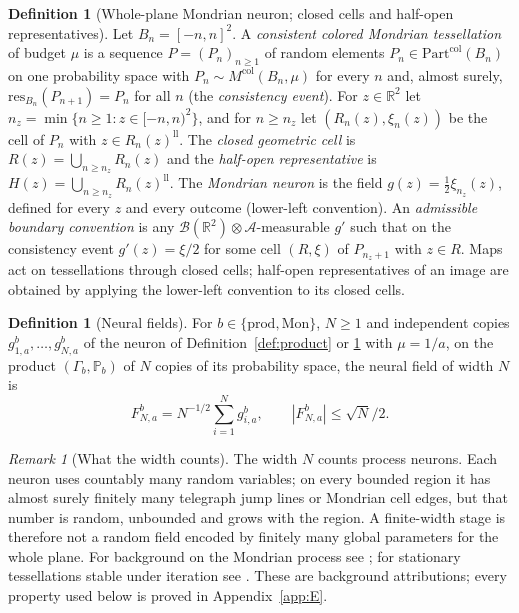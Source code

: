 \documentclass[11pt]{article}
\theoremstyle{plain}
\theoremstyle{definition}
\newtheorem{definition}[theorem]{Definition}
\theoremstyle{remark}
\newtheorem{remark}[theorem]{Remark}
\newcommand{\R}{\mathbb{R}}
\newcommand{\PP}{\mathbb{P}}
\newcommand{\cB}{\mathcal{B}}
\newcommand{\cA}{\mathcal{A}}
\newcommand{\bprod}{\mathrm{prod}}
\newcommand{\bMon}{\mathrm{Mon}}
\newcommand{\Part}{\mathrm{Part}}
\newcommand{\Mcol}{M^{\mathrm{col}}}
\newcommand{\resB}{\mathrm{res}}
\begin{document}
\begin{definition}[Whole-plane Mondrian neuron; closed cells and half-open
representatives]\label{def:mondrian}
Let $B_n=[-n,n]^{2}$. A \emph{consistent colored Mondrian tessellation} of budget
$\mu$ is a sequence $P=(P_n)_{n\ge1}$ of random elements
$P_n\in\Part^{\mathrm{col}}(B_n)$ on one probability space with
$P_n\sim\Mcol(B_n,\mu)$ for every $n$ and, almost surely,
$\resB_{B_n}(P_{n+1})=P_n$ for all $n$ (the \emph{consistency event}). For
$z\in\R^{2}$ let $n_z=\min\{n\ge1:z\in[-n,n)^{2}\}$, and for $n\ge n_z$ let
$(R_n(z),\xi_n(z))$ be the cell of $P_n$ with $z\in R_n(z)^{\mathrm{ll}}$. The
\emph{closed geometric cell} is $R(z)=\bigcup_{n\ge n_z}R_n(z)$ and the
\emph{half-open representative} is $H(z)=\bigcup_{n\ge n_z}R_n(z)^{\mathrm{ll}}$.
The \emph{Mondrian neuron} is the field
$g(z)=\tfrac12\xi_{n_z}(z)$, defined for every $z$ and every outcome
(lower-left convention). An \emph{admissible boundary convention} is any
$\cB(\R^{2})\otimes\cA$-measurable $g'$ such that on the consistency event
$g'(z)=\xi/2$ for some cell $(R,\xi)$ of $P_{n_z+1}$ with $z\in R$. Maps act on
tessellations through closed cells; half-open representatives of an image are
obtained by applying the lower-left convention to its closed cells.
\end{definition}

\begin{definition}[Neural fields]\label{def:neuralfield}
For $b\in\{\bprod,\bMon\}$, $N\ge1$ and independent copies
$g^{b}_{1,a},\dots,g^{b}_{N,a}$ of the neuron of Definition~\ref{def:product} or
\ref{def:mondrian} with $\mu=1/a$, on the product $(\Gamma_b,\PP_b)$ of $N$
copies of its probability space, the neural field of width $N$ is
\begin{equation}\label{eq:neuralfield}
F^{b}_{N,a}=N^{-1/2}\sum_{i=1}^{N}g^{b}_{i,a},\qquad |F^{b}_{N,a}|\le\sqrt N/2 .
\end{equation}
\end{definition}

\begin{remark}[What the width counts]\label{rem:width}
The width $N$ counts process neurons. Each neuron uses countably many random
variables; on every bounded region it has almost surely finitely many telegraph
jump lines or Mondrian cell edges, but that number is random, unbounded and
grows with the region. A finite-width stage is therefore not a random field
encoded by finitely many global parameters for the whole plane. For background
on the Mondrian process see \cite{RoyTeh2008}; for stationary tessellations
stable under iteration see \cite{NagelWeiss2005}. These are background
attributions; every property used below is proved in Appendix~\ref{app:E}.
\end{remark}
\end{document}
